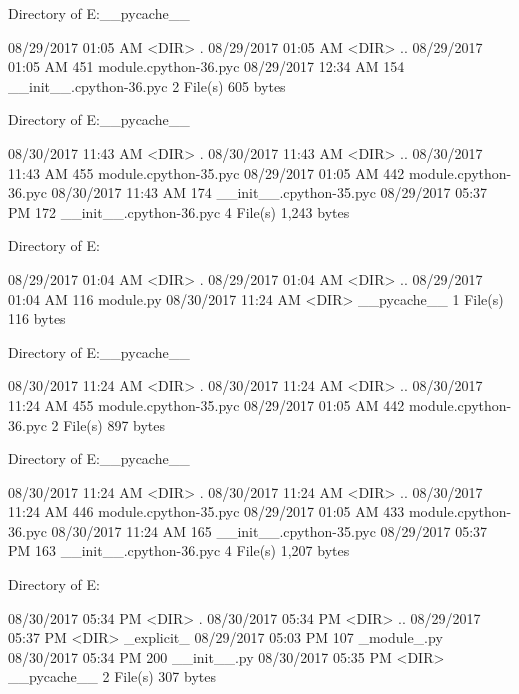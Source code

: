  Directory of E:\Python\apeman\mockup\explicit\explicit\explicit\__pycache__

08/29/2017  01:05 AM    <DIR>          .
08/29/2017  01:05 AM    <DIR>          ..
08/29/2017  01:05 AM               451 module.cpython-36.pyc
08/29/2017  12:34 AM               154 __init__.cpython-36.pyc
               2 File(s)            605 bytes

 Directory of E:\Python\apeman\mockup\explicit\explicit\__pycache__

08/30/2017  11:43 AM    <DIR>          .
08/30/2017  11:43 AM    <DIR>          ..
08/30/2017  11:43 AM               455 module.cpython-35.pyc
08/29/2017  01:05 AM               442 module.cpython-36.pyc
08/30/2017  11:43 AM               174 __init__.cpython-35.pyc
08/29/2017  05:37 PM               172 __init__.cpython-36.pyc
               4 File(s)          1,243 bytes

 Directory of E:\Python\apeman\mockup\explicit\implicit

08/29/2017  01:04 AM    <DIR>          .
08/29/2017  01:04 AM    <DIR>          ..
08/29/2017  01:04 AM               116 module.py
08/30/2017  11:24 AM    <DIR>          __pycache__
               1 File(s)            116 bytes

 Directory of E:\Python\apeman\mockup\explicit\implicit\__pycache__

08/30/2017  11:24 AM    <DIR>          .
08/30/2017  11:24 AM    <DIR>          ..
08/30/2017  11:24 AM               455 module.cpython-35.pyc
08/29/2017  01:05 AM               442 module.cpython-36.pyc
               2 File(s)            897 bytes

 Directory of E:\Python\apeman\mockup\explicit\__pycache__

08/30/2017  11:24 AM    <DIR>          .
08/30/2017  11:24 AM    <DIR>          ..
08/30/2017  11:24 AM               446 module.cpython-35.pyc
08/29/2017  01:05 AM               433 module.cpython-36.pyc
08/30/2017  11:24 AM               165 __init__.cpython-35.pyc
08/29/2017  05:37 PM               163 __init__.cpython-36.pyc
               4 File(s)          1,207 bytes

 Directory of E:\Python\apeman\mockup\explicitImport

08/30/2017  05:34 PM    <DIR>          .
08/30/2017  05:34 PM    <DIR>          ..
08/29/2017  05:37 PM    <DIR>          _explicit_
08/29/2017  05:03 PM               107 _module_.py
08/30/2017  05:34 PM               200 __init__.py
08/30/2017  05:35 PM    <DIR>          __pycache__
               2 File(s)            307 bytes

